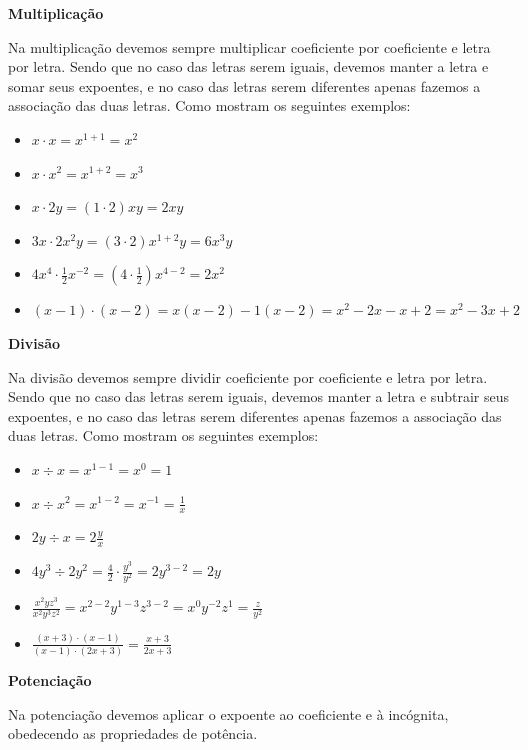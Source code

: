   \vskip0.3cm

 \textbf{Multiplicação}

 Na multiplicação devemos sempre multiplicar coeficiente por coeficiente e letra por letra. Sendo que no caso das letras serem iguais, devemos manter a letra e somar seus expoentes, e no caso das letras serem diferentes apenas fazemos a associação das duas letras. Como mostram os seguintes exemplos:

  \begin{itemize}
   \item $x \cdot x = x^{1+1}= x^2$
   \item $x \cdot x^2= x^{1+2}= x^3$
   \item $x \cdot 2y= (1 \cdot 2)xy= 2xy$
   \item $3x \cdot 2x^2y= (3 \cdot 2)x^{1+2}y= 6x^3y$
   \item $4x^4 \cdot \frac{1}{2}x^{-2}= (4 \cdot \frac{1}{2})x^{4-2}= 2x^2$
   \item $(x - 1) \cdot (x - 2)= x(x-2) - 1(x-2)= x^2 -2x -x +2= x^2 - 3x + 2$
  \end{itemize}

  \vskip0.3cm

   \textbf{Divisão}

   Na divisão devemos sempre dividir coeficiente por coeficiente e letra por letra. Sendo que no caso das letras serem iguais, devemos manter a letra e subtrair seus expoentes, e no caso das letras serem diferentes apenas fazemos a associação das duas letras. Como mostram os seguintes exemplos:

  \begin{itemize}
   \item $x \div x= x^{1-1}= x^0= 1$
   \item $x \div x^2= x^{1-2}= x^{-1}= \frac{1}{x}$
   \item $2y \div x= 2\frac{y}{x}$
   \item $4y^3 \div 2y^2= \frac{4}{2} \cdot \frac{y^3}{y^2}= 2y^{3-2}= 2y$
   \item $\frac{x^2yz^3}{x^2y^3z^2}= x^{2-2}y^{1-3}z^{3-2}= x^0 y^{-2}z^{1}= \frac{z}{y^2}$
   \item $\frac{(x+3) \cdot (x-1)}{(x-1)\cdot (2x+3)}= \frac{x+3}{2x+3}$
  \end{itemize}

 \vskip0.3cm

  \textbf{Potenciação}

  Na potenciação devemos aplicar o expoente ao coeficiente e à incógnita, obedecendo as propriedades de potência.

